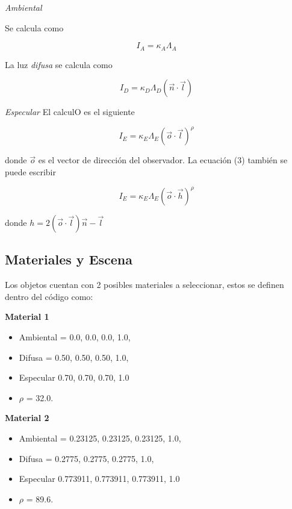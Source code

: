 \documentclass[12pt]{article}
\begin{document}
\textit{Ambiental}

Se calcula como

\begin{equation}
I_{A}=\kappa_{A}\Lambda_{A}
\end{equation}

La luz \textit {difusa} se calcula como 

\begin{equation}
I_{D}=\kappa_{D}\Lambda_{D}(\vec{n} \cdot \vec{l})
\end{equation}

\textit{Especular}
El calculO es el siguiente

\begin{equation} \label{eq:3}
I_{E}=\kappa_{E}\Lambda_{E}(\vec{o} \cdot \vec{l})^{\rho}
\end{equation}

donde $\vec{o}$ es el vector de dirección del observador. La ecuación (3) también se puede escribir

\begin{equation}
I_{E}=\kappa_{E}\Lambda_{E}(\vec{o} \cdot \vec{h})^{\rho}
\end{equation}


donde $h=2(\vec{o} \cdot \vec{l})\vec{n}-\vec{l}$

\subsection{Materiales y Escena}
Los objetos cuentan con 2 posibles materiales a seleccionar, estos se definen dentro del código como:

\textbf{Material 1}
\begin{itemize}
\item Ambiental = {0.0, 0.0, 0.0, 1.0},
\item Difusa = {0.50, 0.50, 0.50, 1.0},
\item Especular {0.70, 0.70, 0.70, 1.0} 
\item $\rho$ = 32.0.
\end{itemize}


\textbf{Material 2}
\begin{itemize}
\item Ambiental = {0.23125, 0.23125, 0.23125, 1.0},
\item Difusa = {0.2775, 0.2775, 0.2775, 1.0},
\item Especular {0.773911, 0.773911, 0.773911, 1.0}
\item $\rho$ = 89.6.
\end{itemize}
\end{document}
